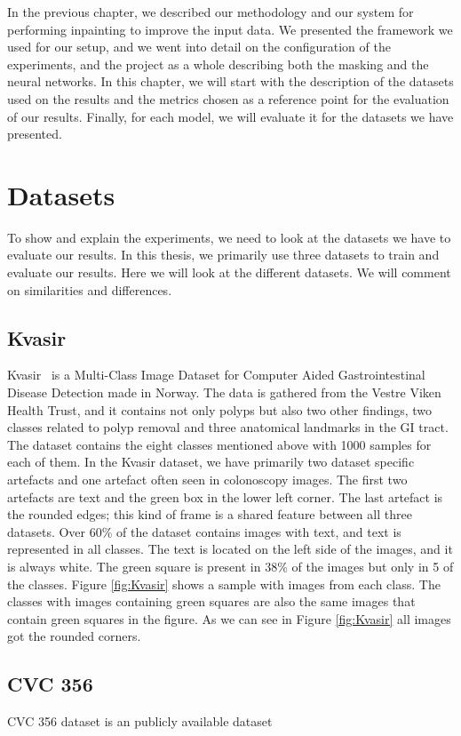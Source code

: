In the previous chapter, we described our methodology and our system for performing inpainting to improve the input data. We presented the framework we used for our setup, and we went into detail on the configuration of the experiments, and the project as a whole describing both the masking and the neural networks. 
In this chapter, we will start with the description of the datasets used on the results and the metrics chosen as a reference point for the evaluation of our results. 
Finally, for each model, we will evaluate it for the datasets we have presented.

\section{Datasets}
To show and explain the experiments, we need to look at the datasets we have to evaluate our results. 
In this thesis, we primarily use three datasets to train and evaluate our results. Here we will look at the different datasets. We will comment on similarities and differences. 


\subsection{Kvasir}
Kvasir~\cite{Pogorelov:2017:KMI:3083187.3083212} is a Multi-Class Image Dataset for Computer Aided Gastrointestinal Disease Detection made in Norway. The data is gathered from the Vestre Viken Health Trust, and it contains not only polyps but also two other findings, two classes related to polyp removal and three anatomical landmarks in the GI tract.
The dataset contains the eight classes mentioned above with 1000 samples for each of them.  In the Kvasir dataset, we have primarily two dataset specific artefacts and one artefact often seen in colonoscopy images. The first two artefacts are text and the green box in the lower left corner. The last artefact is the rounded edges; this kind of frame is a shared feature between all three datasets.
Over 60\% of the dataset contains images with text, and text is represented in all classes. The text is located on the left side of the images, and it is always white.
The green square is present in 38\% of the images but only in 5 of the classes. Figure \ref{fig:Kvasir} shows a sample with images from each class. The classes with images containing green squares are also the same images that contain green squares in the figure.
As we can see in Figure \ref{fig:Kvasir} all images got the rounded corners.


\subsection{CVC 356}
CVC 356 dataset is an publicly available dataset

